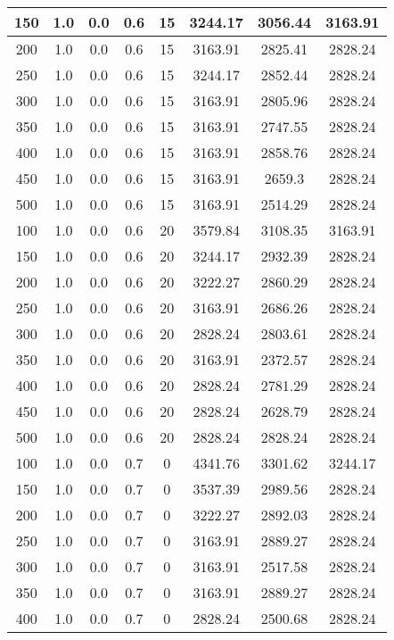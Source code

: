 \documentclass[a4paper, 12pt]{extreport}
\begin{document}
\begin{itemize}
\begin{longtable}{|c|c|c|c|c|c|c|c|}
			150 & 1.0 & 0.0 & 0.6 & 15 & 3244.17 & 3056.44 & 3163.91 \\\hline
			200 & 1.0 & 0.0 & 0.6 & 15 & 3163.91 & 2825.41 & 2828.24 \\\hline
			250 & 1.0 & 0.0 & 0.6 & 15 & 3244.17 & 2852.44 & 2828.24 \\\hline
			300 & 1.0 & 0.0 & 0.6 & 15 & 3163.91 & 2805.96 & 2828.24 \\\hline
			350 & 1.0 & 0.0 & 0.6 & 15 & 3163.91 & 2747.55 & 2828.24 \\\hline
			400 & 1.0 & 0.0 & 0.6 & 15 & 3163.91 & 2858.76 & 2828.24 \\\hline
			450 & 1.0 & 0.0 & 0.6 & 15 & 3163.91 & 2659.3 & 2828.24 \\\hline
			500 & 1.0 & 0.0 & 0.6 & 15 & 3163.91 & 2514.29 & 2828.24 \\\hline
			100 & 1.0 & 0.0 & 0.6 & 20 & 3579.84 & 3108.35 & 3163.91 \\\hline
			150 & 1.0 & 0.0 & 0.6 & 20 & 3244.17 & 2932.39 & 2828.24 \\\hline
			200 & 1.0 & 0.0 & 0.6 & 20 & 3222.27 & 2860.29 & 2828.24 \\\hline
			250 & 1.0 & 0.0 & 0.6 & 20 & 3163.91 & 2686.26 & 2828.24 \\\hline
			300 & 1.0 & 0.0 & 0.6 & 20 & 2828.24 & 2803.61 & 2828.24 \\\hline
			350 & 1.0 & 0.0 & 0.6 & 20 & 3163.91 & 2372.57 & 2828.24 \\\hline
			400 & 1.0 & 0.0 & 0.6 & 20 & 2828.24 & 2781.29 & 2828.24 \\\hline
			450 & 1.0 & 0.0 & 0.6 & 20 & 2828.24 & 2628.79 & 2828.24 \\\hline
			500 & 1.0 & 0.0 & 0.6 & 20 & 2828.24 & 2828.24 & 2828.24 \\\hline
			100 & 1.0 & 0.0 & 0.7 & 0 & 4341.76 & 3301.62 & 3244.17 \\\hline
			150 & 1.0 & 0.0 & 0.7 & 0 & 3537.39 & 2989.56 & 2828.24 \\\hline
			200 & 1.0 & 0.0 & 0.7 & 0 & 3222.27 & 2892.03 & 2828.24 \\\hline
			250 & 1.0 & 0.0 & 0.7 & 0 & 3163.91 & 2889.27 & 2828.24 \\\hline
			300 & 1.0 & 0.0 & 0.7 & 0 & 3163.91 & 2517.58 & 2828.24 \\\hline
			350 & 1.0 & 0.0 & 0.7 & 0 & 3163.91 & 2889.27 & 2828.24 \\\hline
			400 & 1.0 & 0.0 & 0.7 & 0 & 2828.24 & 2500.68 & 2828.24 \\\hline

\end{longtable}
\end{itemize}
\end{document}
